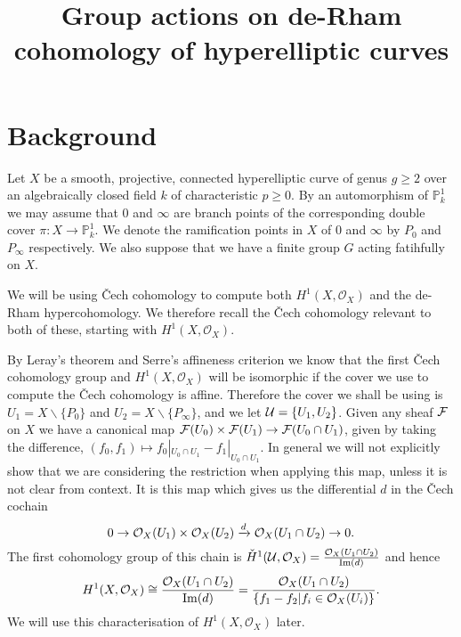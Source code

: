 \documentclass[draft, 11pt]{article} %
\title{Group actions on de-Rham cohomology of hyperelliptic curves}
\author{}
\theoremstyle{plain}
\theoremstyle{remark}
\newcommand{\cO}{{\cal O}}
\newcommand{\cech}{\v{C}ech }
\newcommand{\hone}{H^1(X,\mathcal{O}_X)}
\newcommand{\cechhone}{\check{H}^1(\mathcal U,\mathcal O_X)}
\DeclareMathOperator{\Ima}{Im}
\begin{document}
\maketitle

\section{Background}

Let $X$ be a smooth, projective, connected hyperelliptic curve of genus $g \geq 2$ over an algebraically closed field $k$ of characteristic $p \geq 0$.
By an automorphism of $ \mathbb P_k^1$ we may assume that 0 and $\infty$ are branch points of the corresponding double cover $\pi : X \rightarrow \mathbb P_k^1$.
We denote the ramification points in $X$ of 0 and $\infty$ by $P_0$ and $P_\infty$ respectively.
We also suppose that we have a finite group $G$ acting fatihfully on $X$.

We will be using \cech cohomology to compute both $\hone$ and the de-Rham hypercohomology.
We therefore recall the \cech cohomology relevant to both of these, starting with $\hone$.

By Leray's theorem \cite[Thm 5.2.12]{liu} and Serre's affineness criterion \cite[Thm 5.2.23]{liu} we know that the first \cech cohomology group and $\hone$ will be isomorphic if the cover we use to compute the \cech cohomology is affine.
Therefore the cover we shall be using is $U_1 = X\backslash \{ P_0 \}$ and $U_2 = X\backslash \{ P_\infty \}$, and we let ${\cal U} = \{ U_1, U_2\}$.
Given any sheaf $\cal F$ on $X$ we have a canonical map ${\cal F}(U_0) \times {\cal F} (U_1) \rightarrow {\cal F}(U_0 \cap U_1)$, given by taking the difference, $(f_0,f_1) \mapsto f_0|_{U_0 \cap U_1} - f_1|_{U_0 \cap U_1}$.
In general we will not explicitly show that we are considering the restriction when applying this map, unless it is not clear from context.
It is this map which gives us the differential $d$ in the \cech cochain
\begin{equation*}
0 \rightarrow \cO_X(U_1)\times \cO_X(U_2) \xrightarrow{d} \cO_X(U_1 \cap U_2) \rightarrow 0.
\end{equation*}
The first cohomology group of this chain is $\cechhone = \frac{\cO_X(U_1 \cap U_2)}{\Ima(d)}$ and hence
\begin{equation}
\hone \cong \frac{\cO_X(U_1 \cap U_2)}{\Ima(d)}  
 = \frac{\cO_X(U_1 \cap U_2)}{\{f_1 - f_2 | f_i \in \cO_X(U_i) \}}.
\end{equation}
We will use this characterisation of $\hone$ later.
\end{document}
